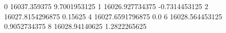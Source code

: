 0 16037.359375 9.7001953125
1 16026.927734375 -0.7314453125
2 16027.8154296875 0.15625
4 16027.6591796875 0.0
6 16028.564453125 0.9052734375
8 16028.94140625 1.2822265625

